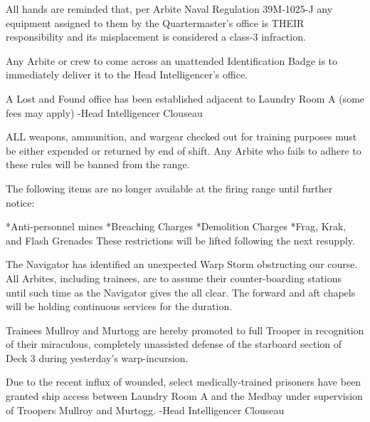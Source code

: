 
All hands are reminded that, per Arbite Naval Regulation 39M-1025-J any equipment assigned to them by the Quartermaster's office is THEIR responsibility and its misplacement is considered a class-3 infraction.


Any Arbite or crew to come across an unattended Identification Badge is to immediately deliver it to the Head Intelligencer's office.


A Lost and Found office has been established adjacent to Laundry Room A (some fees may apply)
-Head Intelligencer Clouseau


ALL weapons, ammunition, and wargear checked out for training purposes must be either expended or returned by end of shift. 
Any Arbite who fails to adhere to these rules will be banned from the range.


The following items are no longer available at the firing range until further notice: 

*Anti-personnel mines
*Breaching Charges
*Demolition Charges
*Frag, Krak, and Flash Grenades
These restrictions will be lifted following the next resupply.


The Navigator has identified an unexpected Warp Storm obstructing our course. 
All Arbites, including trainees, are to assume their counter-boarding stations until such time as the Navigator gives the all clear. 
The forward and aft chapels will be holding continuous services for the duration.


Trainees Mullroy and Murtogg are hereby promoted to full Trooper in recognition of their miraculous, completely unassisted defense of the starboard section of Deck 3 during yesterday's warp-incursion.


Due to the recent influx of wounded, select medically-trained prisoners have been granted ship access between Laundry Room A and the Medbay under supervision of Troopers Mullroy and Murtogg.
-Head Intelligencer Clouseau

